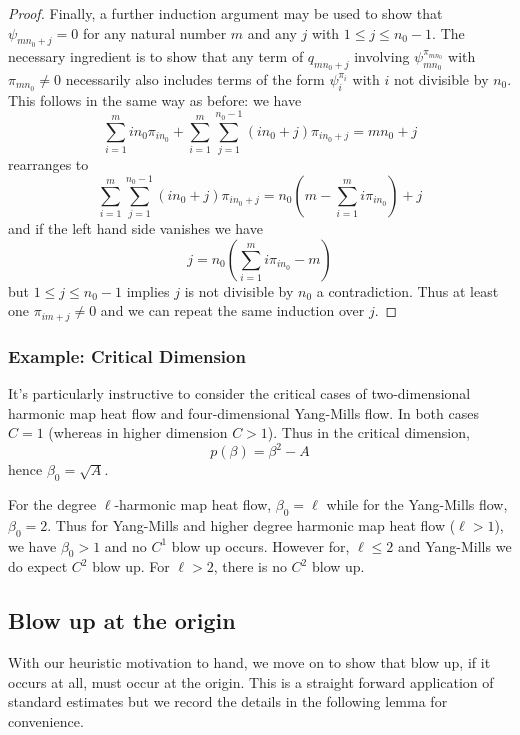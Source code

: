 \documentclass{amsart}
\begin{document}
\begin{proof}
Finally, a further induction argument may be used to show that \(\psi_{m n_0 +j} = 0\) for any natural number \(m\) and any \(j\) with \(1 \leq j \leq n_0 - 1\). The necessary ingredient is to show that any term of \(q_{m n_0 + j}\) involving \(\psi_{m n_0}^{\pi_{m n_0}}\) with \(\pi_{m n_0} \ne 0\) necessarily also includes terms of the form \(\psi_i^{\pi_i}\) with \(i\) not divisible by \(n_0\). This follows in the same way as before: we have
\[
\sum_{i=1}^m i n_0 \pi_{i n_0} + \sum_{i=1}^m \sum_{j=1}^{n_0 -1} (i n_0 + j) \pi_{i n_0 + j} = m n_0 + j
\]
rearranges to
\[
\sum_{i=1}^m \sum_{j=1}^{n_0 -1} (i n_0 + j) \pi_{i n_0 + j} = n_0\left(m - \sum_{i=1}^m i \pi_{i n_0}\right) + j
\]
and if the left hand side vanishes we have
\[
j = n_0\left(\sum_{i=1}^m i \pi_{i n_0} - m\right)
\]
but \(1 \leq j \leq n_0 - 1\) implies \(j\) is not divisible by \(n_0\) a contradiction. Thus at least one \(\pi_{im + j} \ne 0\) and we can repeat the same induction over \(j\).
\end{proof}

\subsubsection*{Example: Critical Dimension}

It's particularly instructive to consider the critical cases of two-dimensional harmonic map heat flow and four-dimensional Yang-Mills flow. In both cases \(C = 1\) (whereas in higher dimension \(C > 1\)). Thus in the critical dimension,
\[
p(\beta) = \beta^2 - A
\]
hence \(\beta_0 = \sqrt{A}\).

For the degree \(\ell\)-harmonic map heat flow, \(\beta_0 = \ell\) while for the Yang-Mills flow, \(\beta_0 = 2\). Thus for Yang-Mills and higher degree harmonic map heat flow (\(\ell > 1\)), we have \(\beta_0 > 1\) and no \(C^1\) blow up occurs. However for, \(\ell \leq 2\) and Yang-Mills we do expect \(C^2\) blow up. For \(\ell > 2\), there is no \(C^2\) blow up.

\subsection{Blow up at the origin}

With our heuristic motivation to hand, we move on to show that blow up, if it occurs at all, must occur at the origin. This is a straight forward application of standard estimates \cite[Theorem 10.1]{Ladyzhenskaja:/1967} but we record the details in the following lemma for convenience.
\end{document}
